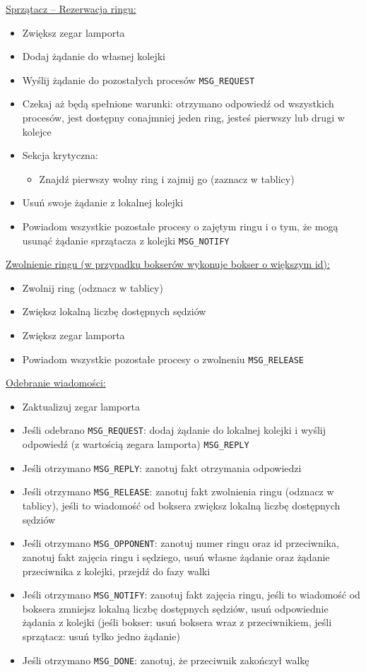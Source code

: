 \documentclass{article}
\begin{document}
\underline{Sprzątacz -- Rezerwacja ringu:}
\begin{itemize}
    \item Zwiększ zegar lamporta
    \item Dodaj żądanie do własnej kolejki
    \item Wyślij żądanie do pozostałych procesów \verb|MSG_REQUEST|
    \item Czekaj aż będą spełnione warunki: otrzymano odpowiedź od
    wszystkich procesów, jest dostępny conajmniej jeden ring, jesteś
    pierwszy lub drugi w kolejce
    \item Sekcja krytyczna:
    \begin{itemize}
        \item Znajdź pierwszy wolny ring i zajmij go (zaznacz w tablicy)
    \end{itemize}
    \item Usuń swoje żądanie z lokalnej kolejki
    \item Powiadom wszystkie pozostałe procesy o zajętym ringu i o tym,
    że mogą usunąć żądanie sprzątacza z kolejki \verb|MSG_NOTIFY|
\end{itemize}

\underline{Zwolnienie ringu (w przypadku bokserów wykonuje bokser o większym id):}
\begin{itemize}
    \item Zwolnij ring (odznacz w tablicy)
    \item Zwiększ lokalną liczbę dostępnych sędziów
    \item Zwiększ zegar lamporta
    \item Powiadom wszystkie pozostałe procesy o zwolneniu \verb|MSG_RELEASE|
\end{itemize}

\underline{Odebranie wiadomości:}
\begin{itemize}
    \item Zaktualizuj zegar lamporta
    \item Jeśli odebrano \verb|MSG_REQUEST|: dodaj żądanie do lokalnej
    kolejki i  wyślij odpowiedź (z wartością zegara lamporta) \verb|MSG_REPLY|
    \item Jeśli otrzymano \verb|MSG_REPLY|: zanotuj fakt otrzymania
    odpowiedzi
    \item Jeśli otrzymano \verb|MSG_RELEASE|: zanotuj fakt zwolnienia
    ringu (odznacz w tablicy), jeśli to wiadomość od boksera zwiększ
    lokalną liczbę dostępnych sędziów
    \item Jeśli otrzymano \verb|MSG_OPPONENT|: zanotuj numer ringu oraz
    id przeciwnika, zanotuj fakt zajęcia ringu i sędziego, usuń własne
    żądanie oraz żądanie przeciwnika z kolejki, przejdź do fazy walki
    \item Jeśli otrzymano \verb|MSG_NOTIFY|: zanotuj fakt zajęcia ringu,
    jeśli to wiadomość od boksera zmniejsz lokalną liczbę dostępnych
    sędziów, usuń odpowiednie żądania z kolejki (jeśli bokser: usuń
    boksera wraz z przeciwnikiem, jeśli sprzątacz: usuń tylko jedno
    żądanie)
    \item Jeśli otrzymano \verb|MSG_DONE|: zanotuj, że przeciwnik
    zakończył walkę
\end{itemize}
\end{document}
